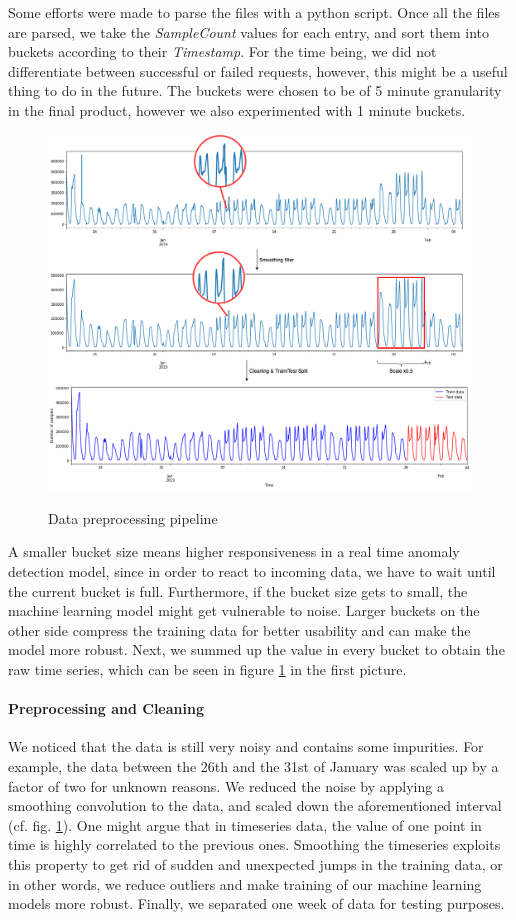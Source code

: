 Some efforts were made to parse the files with a python script. Once all the files are parsed, we take the \textit{SampleCount} values for each entry, and sort them into buckets according to their \textit{Timestamp}. For the time being, we did not differentiate between successful or failed requests, however, this might be a useful thing to do in the future. The buckets were chosen to be of 5 minute granularity in the final product, however we also experimented with 1 minute buckets.
\begin{figure}[H]
    \centering
    \includegraphics[width=1\textwidth]{images/data_preprocessing.png}
    \label{fig:data_preprocessing}
    \caption{Data preprocessing pipeline}
\end{figure}
\afterpage{\FloatBarrier}
A smaller bucket size means higher responsiveness in a real time anomaly detection model, since in order to react to incoming data, we have to wait until the current bucket is full. Furthermore, if the bucket size gets to small, the machine learning model might get vulnerable to noise. Larger buckets on the other side compress the training data for better usability and can make the model more robust. Next, we summed up the value in every bucket to obtain the raw time series, which can be seen in figure \ref{fig:data_preprocessing} in the first picture. 
\paragraph{Preprocessing and Cleaning} 
We noticed that the data is still very noisy and contains some impurities. For example, the data between the 26th and the 31st of January was scaled up by a factor of two for unknown reasons.
We reduced the noise by applying a smoothing convolution to the data, and scaled down the aforementioned interval (cf. fig. \ref{fig:data_preprocessing}).
One might argue that in timeseries data, the value of one point in time is highly correlated to the previous ones. Smoothing the timeseries exploits this property to get rid of sudden and unexpected jumps in the training data, or in other words, we reduce outliers and make training of our machine learning models more robust.
Finally, we separated one week of data for testing purposes.
